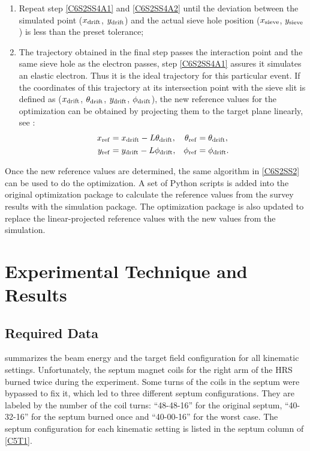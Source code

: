 \begin{enumerate}[parsep=0pt]
\item Repeat step \ref{C6S2SS4A1} and \ref{C6S2SS4A2} until the deviation between the simulated point ($x_{\mathrm{drift}}$, $y_{\mathrm{drift}}$) and the actual sieve hole position ($x_{\mathrm{sieve}}$, $y_{\mathrm{sieve}}$) is less than the preset tolerance;
\item The trajectory obtained in the final step passes the interaction point and the same sieve hole as the electron passes, step \ref{C6S2SS4A1} assures it simulates an elastic electron. Thus it is the ideal trajectory for this particular event. If the coordinates of this trajectory at its intersection point with the sieve slit is defined as ($x_{\mathrm{drift}}$, $\theta_{\mathrm{drift}}$, $y_{\mathrm{drift}}$, $\phi_{\mathrm{drift}}$), the new reference values for the optimization can be obtained by projecting them to the target plane linearly, see :
\begin{align} \label{C6S2SS4E3}
x_{\mathrm{ref}} & = x_{\mathrm{drift}}-L\theta_{\mathrm{drift}}, & \theta_{\mathrm{ref}} & = \theta_{\mathrm{drift}}, \\ \label{C6S2SS4E4}
y_{\mathrm{ref}} & = y_{\mathrm{drift}}-L\phi_{\mathrm{drift}}, & \phi_{\mathrm{ref}} & = \phi_{\mathrm{drift}}.
\end{align}
\end{enumerate}

Once the new reference values are determined, the same algorithm in \cref{C6S2SS2} can be used to do the optimization. A set of Python scripts is added into the original optimization package to calculate the reference values from the survey results with the simulation package. The optimization package is also updated to replace the linear-projected reference values with the new values from the simulation.

\section{Experimental Technique and Results}
\label{C6S3}

\subsection{Required Data}
\label{C6S3SS1}

 summarizes the beam energy and the target field configuration for all kinematic settings. Unfortunately, the septum magnet coils for the right arm of the HRS burned twice during the experiment. Some turns of the coils in the septum were bypassed to fix it, which led to three different septum configurations. They are labeled by the number of the coil turns: ``48-48-16'' for the original septum, ``40-32-16'' for the septum burned once and ``40-00-16'' for the worst case. The septum configuration for each kinematic setting is listed in the septum column of \cref{C5T1}.

